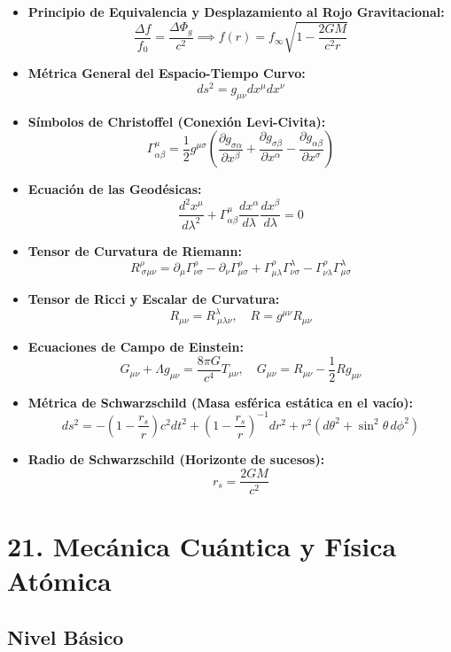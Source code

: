 \documentclass[11pt,a4paper]{article}
\begin{document}
\begin{itemize}
  \item \textbf{Principio de Equivalencia y Desplazamiento al Rojo Gravitacional:}
  \[
    \frac{\Delta f}{f_0} = \frac{\Delta\Phi_g}{c^2} \implies f(r) = f_\infty \sqrt{1 - \frac{2GM}{c^2 r}}
  \]
  \item \textbf{Métrica General del Espacio-Tiempo Curvo:}
  \[
    ds^2 = g_{\mu\nu} dx^\mu dx^\nu
  \]
  \item \textbf{Símbolos de Christoffel (Conexión Levi-Civita):}
  \[
    \Gamma^\mu_{\alpha\beta} = \frac{1}{2} g^{\mu\sigma} \left( \frac{\partial g_{\sigma\alpha}}{\partial x^\beta} + \frac{\partial g_{\sigma\beta}}{\partial x^\alpha} - \frac{\partial g_{\alpha\beta}}{\partial x^\sigma} \right)
  \]
  \item \textbf{Ecuación de las Geodésicas:}
  \[
    \frac{d^2 x^\mu}{d\lambda^2} + \Gamma^\mu_{\alpha\beta} \frac{dx^\alpha}{d\lambda} \frac{dx^\beta}{d\lambda} = 0
  \]
  \item \textbf{Tensor de Curvatura de Riemann:}
  \[
    R^\rho_{\ \sigma\mu\nu} = \partial_\mu \Gamma^\rho_{\nu\sigma} - \partial_\nu \Gamma^\rho_{\mu\sigma} + \Gamma^\rho_{\mu\lambda} \Gamma^\lambda_{\nu\sigma} - \Gamma^\rho_{\nu\lambda} \Gamma^\lambda_{\mu\sigma}
  \]
  \item \textbf{Tensor de Ricci y Escalar de Curvatura:}
  \[
    R_{\mu\nu} = R^\lambda_{\ \mu\lambda\nu}, \quad R = g^{\mu\nu} R_{\mu\nu}
  \]
  \item \textbf{Ecuaciones de Campo de Einstein:}
  \[
    G_{\mu\nu} + \Lambda g_{\mu\nu} = \frac{8\pi G}{c^4} T_{\mu\nu}, \quad G_{\mu\nu} = R_{\mu\nu} - \frac{1}{2} R g_{\mu\nu}
  \]
  \item \textbf{Métrica de Schwarzschild (Masa esférica estática en el vacío):}
  \[
    ds^2 = -\left( 1 - \frac{r_s}{r} \right) c^2 dt^2 + \left( 1 - \frac{r_s}{r} \right)^{-1} dr^2 + r^2 (d\theta^2 + \sin^2\theta \, d\phi^2)
  \]
  \item \textbf{Radio de Schwarzschild (Horizonte de sucesos):}
  \[
    r_s = \frac{2GM}{c^2}
  \]
\end{itemize}

\section*{21. Mecánica Cuántica y Física Atómica}

\subsection*{Nivel Básico}
\end{document}
